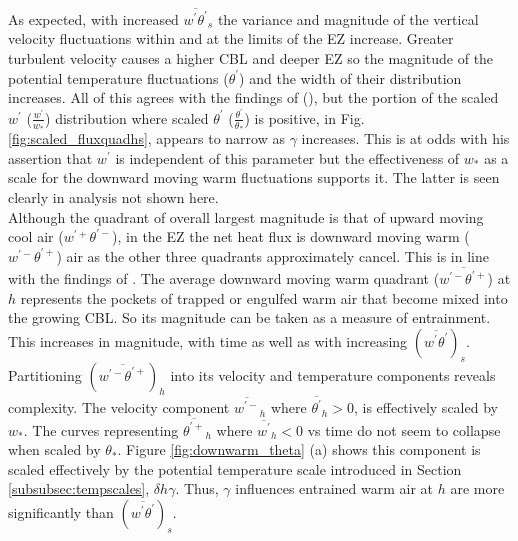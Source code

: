 As expected, with increased $\overline{w^{'}\theta^{'}}_{s}$ the variance and magnitude of the vertical velocity fluctuations within and at the limits of the EZ increase.  Greater turbulent velocity causes a higher CBL and deeper EZ so the magnitude of the potential temperature fluctuations ($\theta^{'}$) and the width of their distribution increases. All of this agrees with the findings of \citeauthor{Sorbjan1} (\citeyear{Sorbjan1}), but the portion of the scaled $w^{'}$ ($\frac{w^{'}}{w_{*}}$) distribution where scaled $\theta^{'}$ ($\frac{\theta^{'}}{\theta_{*}}$) is positive, in Fig. \ref{fig:scaled_fluxquadhs}, appears to narrow as $\gamma$ increases. This is at odds with his assertion that $w^{'}$ is independent of this parameter but the effectiveness of $w_{*}$ as a scale for the downward moving warm fluctuations supports it. The latter is seen clearly in analysis not shown here.\\



Although the quadrant of overall largest magnitude is that of upward moving cool air ($w^{'+}\theta^{'-}$), in the EZ the net heat flux is downward moving warm ($w^{'-}\theta^{'+}$) air as the other three quadrants approximately cancel.  This is in line with the findings of \cite{SullMoengStev}.  The average downward moving warm quadrant ($\overline{w^{'-}\theta^{'+}}$) at $h$ represents the pockets of trapped or engulfed warm air that become mixed into the growing CBL.  So its magnitude can be taken as a measure of entrainment.  This increases in magnitude, with time as well as with increasing $(\overline{w^{'}\theta^{'}})_{s}$.  Partitioning $(\overline{w^{'-}\theta^{'+}})_{h}$ into its velocity and temperature components reveals complexity.  The velocity component $\overline{w^{'-}}_{h}$  where $ \overline{\theta^{'}}_{h}>0$, is effectively scaled by $w_{*}$.  The curves representing $\overline{\theta^{'+}}_{h}$ where $\overline{w^{'}}_{h}<0$ vs time do not seem to collapse when scaled by $\theta_{*}$.  Figure \ref{fig:downwarm_theta} (a) shows this component is scaled effectively by the potential temperature scale introduced in Section \ref{subsubsec:tempscales}, $\delta h \gamma$.  Thus, $\gamma$ influences entrained warm air at $h$ are more significantly than $(\overline{w^{'}\theta^{'}})_{s}$.\\ 
\\   

